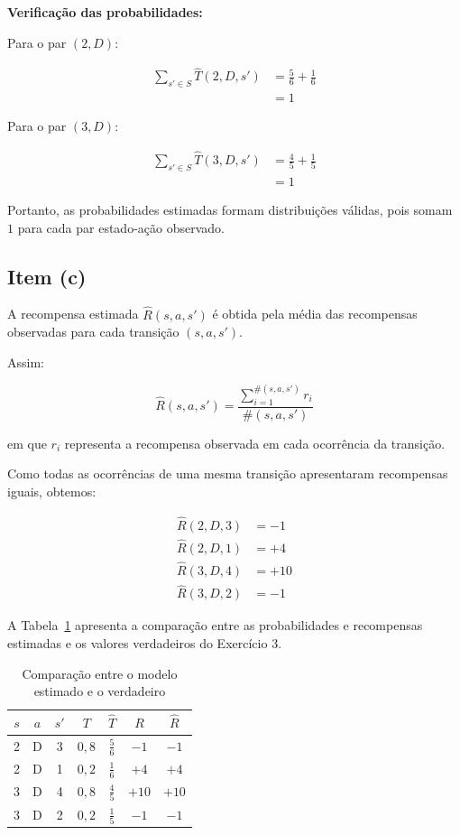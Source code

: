 \textbf{Verificação das probabilidades:}

Para o par $(2,D)$:

\[
\begin{aligned}
\sum_{s'\in S}\hat{T}(2,D,s')
&=\frac{5}{6}+\frac{1}{6}\\
&=1
\end{aligned}
\]

Para o par $(3,D)$:

\[
\begin{aligned}
\sum_{s'\in S}\hat{T}(3,D,s')
&=\frac{4}{5}+\frac{1}{5}\\
&=1
\end{aligned}
\]

Portanto, as probabilidades estimadas
formam distribuições válidas, pois
somam $1$ para cada par estado-ação
observado.


\subsection{Item (c)}

A recompensa estimada $\hat{R}(s,a,s')$
é obtida pela média das recompensas
observadas para cada transição $(s,a,s')$.

Assim:

\[
\hat{R}(s,a,s') =
\frac{
\sum_{i=1}^{\#(s,a,s')} r_i
}{
\#(s,a,s')
}
\]

em que $r_i$ representa a recompensa
observada em cada ocorrência da transição.

Como todas as ocorrências de uma mesma
transição apresentaram recompensas iguais,
obtemos:

\[
\begin{aligned}
\hat{R}(2,D,3)&=-1\\
\hat{R}(2,D,1)&=+4\\
\hat{R}(3,D,4)&=+10\\
\hat{R}(3,D,2)&=-1
\end{aligned}
\]

A Tabela~\ref{tab:comparacao_modelos}
apresenta a comparação entre as
probabilidades e recompensas estimadas
e os valores verdadeiros do Exercício 3.

\begin{table}[H]
\centering
\caption{Comparação entre o modelo estimado e o verdadeiro}
\label{tab:comparacao_modelos}
\begin{tabular}{ccccccc}
\toprule
$s$ & $a$ & $s'$ &
$T$ & $\hat{T}$ & $R$ & $\hat{R}$\\
\midrule
2 & D & 3 & $0{,}8$ & $\frac{5}{6}$ & $-1$ & $-1$\\
2 & D & 1 & $0{,}2$ & $\frac{1}{6}$ & $+4$ & $+4$\\
3 & D & 4 & $0{,}8$ & $\frac{4}{5}$ & $+10$ & $+10$\\
3 & D & 2 & $0{,}2$ & $\frac{1}{5}$ & $-1$ & $-1$\\
\bottomrule
\end{tabular}
\end{table}

